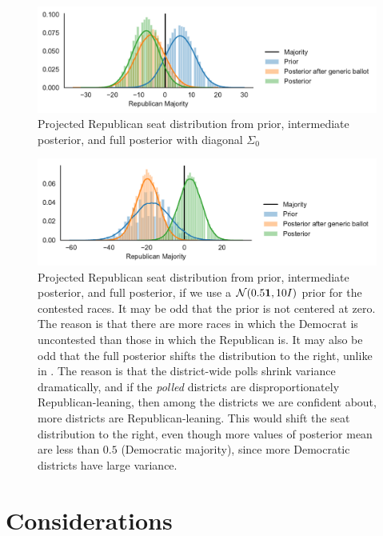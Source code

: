\documentclass[11pt]{article}
\begin{document}
\begin{figure}[tbh]
  \centering
  \includegraphics[width=\textwidth]{rep_seats_with_diagonal_prior.pdf}
  \caption{Projected Republican seat distribution from prior, intermediate
  posterior, and full posterior with diagonal $\Sigma_0$}
  \label{fig:diagonal_prior}
\end{figure}


\begin{figure}[tbh]
  \centering
  \includegraphics[width=\textwidth]{rep_seats_with_diffused_prior.pdf}
  \caption{Projected Republican seat distribution from prior, intermediate posterior, and full posterior, if we use a $\mathcal{N}(0.5\bm{1}, 10I)$ prior for the contested races. It may be odd that the prior is not centered at zero. The reason is that there are more races in which the Democrat is uncontested than those in which the Republican is. It may also be odd that the full posterior shifts the distribution to the right, unlike in . The reason is that the district-wide polls shrink variance dramatically, and if the \emph{polled} districts are disproportionately Republican-leaning, then among the districts we are confident about, more districts are Republican-leaning. This would shift the seat distribution to the right, even though more values of posterior mean are less than $0.5$ (Democratic majority), since more Democratic districts have large variance.}
  \label{fig:hists_diffuse}
\end{figure}

\section{Considerations}




\end{document}
